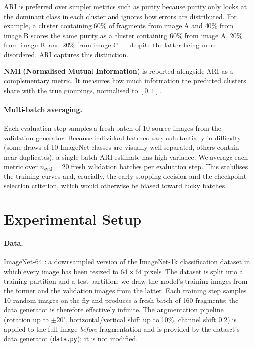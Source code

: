 \documentclass[12pt, a4paper]{article}
\begin{document}
ARI is preferred over simpler metrics such as purity because purity only looks at the
dominant class in each cluster and ignores how errors are distributed. For example, a
cluster containing 60\% of fragments from image A and 40\% from image B scores the same
purity as a cluster containing 60\% from image A, 20\% from image B, and 20\% from image
C — despite the latter being more disordered. ARI captures this distinction.

\textbf{NMI (Normalised Mutual Information)} is reported alongside ARI as a
complementary metric. It measures how much information the predicted clusters share with
the true groupings, normalised to $[0, 1]$.

\paragraph{Multi-batch averaging.}
Each evaluation step samples a fresh batch of 10 source images from the validation
generator. Because individual batches vary substantially in difficulty (some draws of
10 ImageNet classes are visually well-separated, others contain near-duplicates), a
single-batch ARI estimate has high variance. We average each metric over
$n_{\text{eval}} = 20$ fresh validation batches per evaluation step. This stabilises
the training curves and, crucially, the early-stopping decision and the
checkpoint-selection criterion, which would otherwise be biased toward lucky batches.

\section{Experimental Setup}

\paragraph{Data.}
ImageNet-64 \parencite{imagenet64}: a downsampled version of the ImageNet-1k
classification dataset in which every image has been resized to $64 \times 64$
pixels. The dataset is split into a training partition and a test partition; we draw
the model's training images from the former and the validation images from the
latter. Each training step samples 10 random images on the fly and produces a fresh
batch of 160 fragments; the data generator is therefore effectively infinite. The
augmentation pipeline (rotation up to $\pm 20^\circ$, horizontal/vertical shift up
to 10\%, channel shift 0.2) is applied to the full image \emph{before} fragmentation
and is provided by the dataset's data generator (\texttt{data.py}); it is not
modified.
\end{document}
